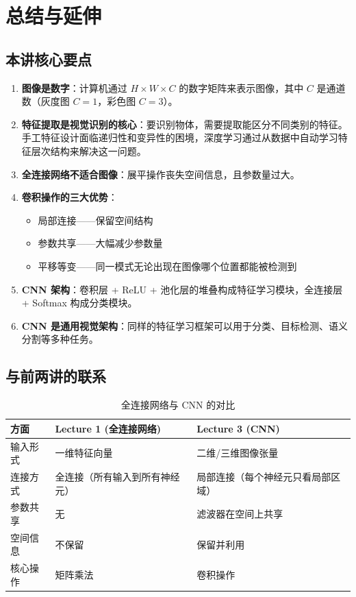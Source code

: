 \section{总结与延伸}

\subsection{本讲核心要点}

\begin{enumerate}
    \item \textbf{图像是数字}：计算机通过 $H \times W \times C$ 的数字矩阵来表示图像，其中 $C$ 是通道数（灰度图 $C=1$，彩色图 $C=3$）。

    \item \textbf{特征提取是视觉识别的核心}：要识别物体，需要提取能区分不同类别的特征。手工特征设计面临递归性和变异性的困境，深度学习通过从数据中自动学习特征层次结构来解决这一问题。

    \item \textbf{全连接网络不适合图像}：展平操作丧失空间信息，且参数量过大。

    \item \textbf{卷积操作的三大优势}：
    \begin{itemize}
        \item 局部连接——保留空间结构
        \item 参数共享——大幅减少参数量
        \item 平移等变——同一模式无论出现在图像哪个位置都能被检测到
    \end{itemize}

    \item \textbf{CNN 架构}：卷积层 + ReLU + 池化层的堆叠构成特征学习模块，全连接层 + Softmax 构成分类模块。

    \item \textbf{CNN 是通用视觉架构}：同样的特征学习框架可以用于分类、目标检测、语义分割等多种任务。
\end{enumerate}

\subsection{与前两讲的联系}

\begin{table}[H]
\centering
\begin{tabular}{p{3cm}p{5cm}p{5cm}}
\toprule
\textbf{方面} & \textbf{Lecture 1 (全连接网络)} & \textbf{Lecture 3 (CNN)} \\
\midrule
输入形式 & 一维特征向量 & 二维/三维图像张量 \\
连接方式 & 全连接（所有输入到所有神经元） & 局部连接（每个神经元只看局部区域） \\
参数共享 & 无 & 滤波器在空间上共享 \\
空间信息 & 不保留 & 保留并利用 \\
核心操作 & 矩阵乘法 & 卷积操作 \\
\bottomrule
\end{tabular}
\caption{全连接网络与 CNN 的对比}
\end{table}

